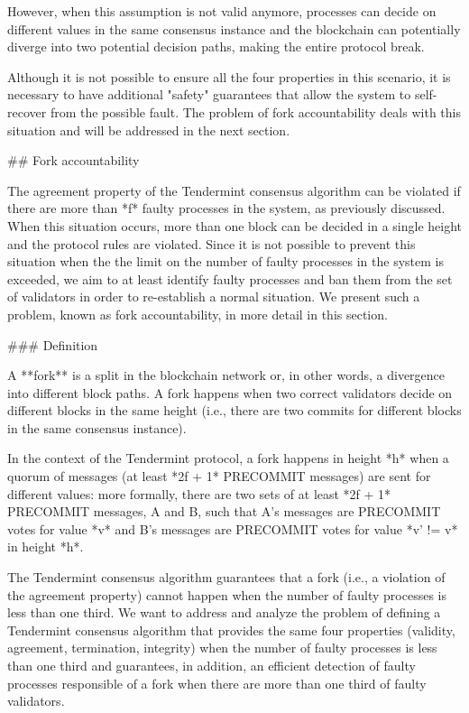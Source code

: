 \documentclass[a4paper,11pt,oneside]{report}
\begin{document}
\begin{markdown}
However, when this assumption is not valid anymore, processes can decide on different values in the same consensus instance and the blockchain can potentially diverge into two potential decision paths, making the entire protocol break.

Although it is not possible to ensure all the four properties in this scenario, it is necessary to have additional "safety" guarantees that allow the system to self-recover from the possible fault. The problem of fork accountability deals with this situation and will be addressed in the next section.

## Fork accountability

The agreement property of the Tendermint consensus algorithm can be violated if there are more than *f* faulty processes in the system, as previously discussed. When this situation occurs, more than one block can be decided in a single height and the protocol rules are violated. Since it is not possible to prevent this situation when the the limit on the number of faulty processes in the system is exceeded, we aim to at least identify faulty processes and ban them from the set of validators in order to re-establish a normal situation. We present such a problem, known as fork accountability, in more detail in this section.  

### Definition

A **fork** is a split in the blockchain network or, in other words, a divergence into different block paths. 
A fork happens when two correct validators decide on different blocks in the same height (i.e., there are two commits for different blocks in the same consensus instance). 

In the context of the Tendermint protocol, a fork happens in height *h* when a quorum of messages (at least *2f + 1* PRECOMMIT messages) are sent for different values: more formally, there are two sets of at least *2f + 1* PRECOMMIT messages, A and B, such that A's messages are PRECOMMIT votes for value *v* and B's messages are PRECOMMIT votes for value *v' != v* in height *h*.  

The Tendermint consensus algorithm guarantees that a fork (i.e., a violation of the agreement property) cannot happen when the number of faulty processes is less than one third.
We want to address and analyze the problem of defining a Tendermint consensus algorithm that provides the same four properties (validity, agreement, termination, integrity) when the number of faulty processes is less than one third and guarantees, in addition, an efficient detection of faulty processes responsible of a fork when there are more than one third of faulty validators.


\end{markdown}
\end{document}
